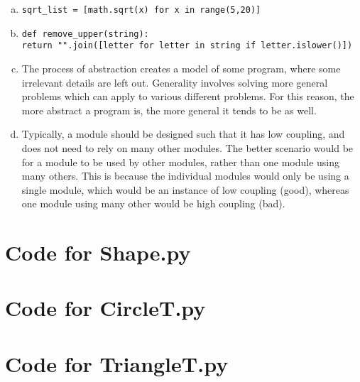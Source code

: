 \documentclass[12pt]{article}
\begin{document}
\begin{enumerate}[a)]
\item \texttt{sqrt\_list = [math.sqrt(x) for x in range(5,20)]}

\item \texttt{def remove\_upper(string):} \\
\text{\quad} \texttt{return "".join([letter for letter in string if letter.islower()])}

\item The process of abstraction creates a model of some program, where some irrelevant details are left out. Generality involves solving more general problems which can apply to various different problems. For this reason, the more abstract a program is, the more general it tends to be as well.

\item Typically, a module should be designed such that it has low coupling, and does not need to rely on many other modules. The better scenario would be for a module to be used by other modules, rather than one module using many others. This is because the individual modules would only be using a single module, which would be an instance of low coupling (good), whereas one module using many other would be high coupling (bad).

\end{enumerate}

\newpage

\lstset{language=Python, basicstyle=\tiny, breaklines=true, showspaces=false,
  showstringspaces=false, breakatwhitespace=true}

\def\thesection{\Alph{section}}

\section{Code for Shape.py}

\noindent 

\newpage

\section{Code for CircleT.py}

\noindent 

\newpage

\section{Code for TriangleT.py}
\end{document}
